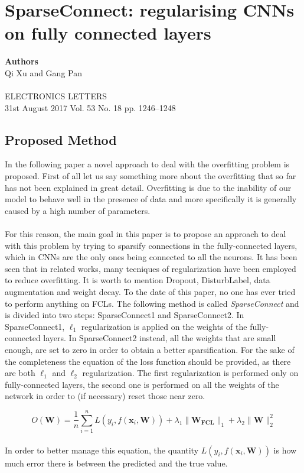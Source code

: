 \chapter{SparseConnect: regularising CNNs on fully connected layers}

{\small \textbf{Authors}\\
Qi Xu and Gang Pan\\ \\
ELECTRONICS LETTERS\\31st August 2017 Vol. 53 No. 18 pp. 1246–1248}

\section{Proposed Method}

In the following paper a novel approach to deal with the overfitting problem is proposed. First of all let us say something more about the overfitting that so far has not been explained in great detail. Overfitting is due to the inability of our model to behave well in the presence of data and more specifically it is generally caused by a high number of parameters.\\ \\
For this reason, the main goal in this paper is to propose an approach to deal with this problem by trying to sparsify connections in the fully-connected layers, which in CNNs are the only ones being connected to all the neurons. It has been seen that in related works, many tecniques of regularization have been employed to reduce overfitting. It is worth to mention Dropout, DisturbLabel, data augmentation and weight decay. To the date of this paper, no one has ever tried to perform anything on FCLs. The following method is called \textit{SparseConnect} and is divided into two steps: SparseConnect1 and SparseConnect2. In SparseConnect1, $\ell_1$ regularization is applied on the weights of the fully-connected layers. In SparseConnect2 instead, all the weights that are small enough, are set to zero in order to obtain a better sparsification. For the sake of the completeness the equation of the loss function should be provided, as there are both $\ell_1$ and $\ell_2$ regularization. The first regularization is performed only on fully-connected layers, the second one is performed on all the weights of the network in order to (if necessary) reset those near zero.

\begin{equation}
\label{eq:03_eq}
    O(\textbf{W}) = \frac{1}{n}\sum_{i = 1}^{n}L(y_i, f(\textbf{x}_i, \textbf{W}))+\lambda_1\|\textbf{W}_\textbf{FCL}\|_1 +\lambda_2\|\textbf{W}\|_2^2
\end{equation}\\
In order to better manage this equation, the quantity $L(y_i, f(\textbf{x}_i, \textbf{W}))$ is how much error there is between the predicted and the true value.

